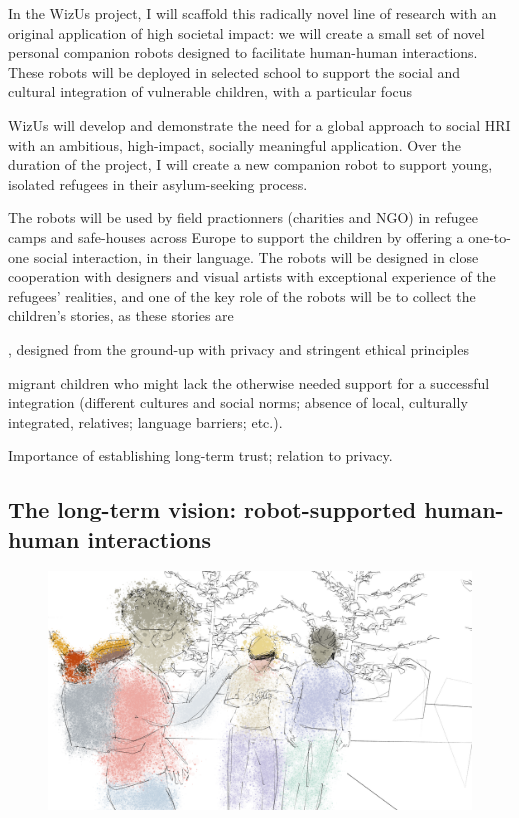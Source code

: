 \documentclass[]{article}
\newcommand{\project}{WizUs\xspace}
\begin{document}
In the \project project, I will scaffold this radically novel line of
research with an original application of high societal impact: we will create a
small set of novel personal companion robots designed to facilitate human-human
interactions. These robots will be deployed in selected school to support the
social and cultural integration of vulnerable children, with a particular focus



\project will develop and demonstrate the need for a global approach to social
HRI with an ambitious, high-impact, socially meaningful application. Over the
duration of the project, I will create a new companion robot to support young,
isolated refugees in their asylum-seeking process.

The robots will be used by field practionners (charities and NGO) in refugee
camps and safe-houses across Europe to support the children by offering a
one-to-one social interaction, in their language. The robots will be designed in
close cooperation with designers and visual artists with exceptional experience
of the refugees' realities, and one of the key role of the robots will be to
collect the children's stories, as these stories are

, designed from the
ground-up with privacy and stringent ethical principles

migrant children who might lack the otherwise needed support for a successful
integration (different cultures and social norms; absence of local, culturally
integrated, relatives; language barriers; etc.).


Importance of establishing long-term trust; relation to privacy.


\subsection{The long-term vision: robot-supported human-human interactions}


\begin{figure}[!htbp]
    \centering
    \includegraphics[width=0.9\linewidth]{figs/render5-colors.png}
\end{figure}
\end{document}
